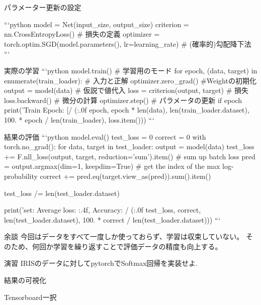 \begin{frame}[fragile]{パラメーター更新の設定}

```python
model = Net(input_size, output_size)
criterion = nn.CrossEntropyLoss() # 損失の定義
optimizer = torch.optim.SGD(model.parameters(), lr=learning_rate) # (確率的)勾配降下法
```


\end{frame}
\begin{frame}[fragile]{}実際の学習
```python
model.train() # 学習用のモード
for epoch, (data, target) in enumerate(train_loader): # 入力と正解
     optimizer.zero_grad() #Weightの初期化
     output = model(data) # 仮説で値代入
     loss = criterion(output, target) # 損失
     loss.backward() # 微分の計算
     optimizer.step() # パラメータの更新
     if epoch %
         print('Train Epoch: {} [{}/{} ({:.0f}%
             epoch, epoch * len(data), len(train_loader.dataset),
             100. * epoch / len(train_loader), loss.item()))
```

\end{frame}
\begin{frame}[fragile]{}結果の評価
```python
model.eval()
test_loss = 0
correct = 0
with torch.no_grad():
    for data, target in test_loader:
        output = model(data)
        test_loss += F.nll_loss(output, target, reduction='sum').item() # sum up batch loss
        pred = output.argmax(dim=1, keepdim=True) # get the index of the max log-probability
        correct += pred.eq(target.view_as(pred)).sum().item()

test_loss /= len(test_loader.dataset)

print('\nTest set: Average loss: {:.4f}, Accuracy: {}/{} ({:.0f}%
    test_loss, correct, len(test_loader.dataset),
    100. * correct / len(test_loader.dataset)))
```

\end{frame}
\begin{frame}[fragile]{}余談
今回はデータをすべて一度しか使っておらず、学習は収束していない。 そのため、何回か学習を繰り返すことで評価データの精度も向上する。

\end{frame}
\begin{frame}[fragile]{}演習
IRISのデータに対してpytorchでSoftmax回帰を実装せよ.


\end{frame}
\begin{frame}[fragile]{}結果の可視化

Tensorboard一択

\end{frame}
